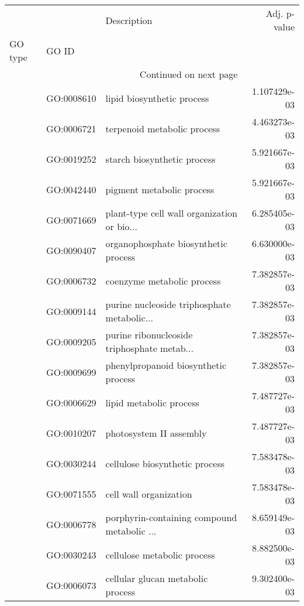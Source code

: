 \begin{longtable}{lllr}
\toprule
   &            &                                  Description &  Adj. p-value \\
GO type & GO ID &                                              &               \\
\midrule
\endhead
\midrule
\multicolumn{3}{r}{{Continued on next page}} \\
\midrule
\endfoot

\bottomrule
\endlastfoot
\multirow{71}{*}{BP} & GO:0008610 &                   lipid biosynthetic process &  1.107429e-03 \\
   & GO:0006721 &                  terpenoid metabolic process &  4.463273e-03 \\
   & GO:0019252 &                  starch biosynthetic process &  5.921667e-03 \\
   & GO:0042440 &                    pigment metabolic process &  5.921667e-03 \\
   & GO:0071669 &  plant-type cell wall organization or bio... &  6.285405e-03 \\
   & GO:0090407 &         organophosphate biosynthetic process &  6.630000e-03 \\
   & GO:0006732 &                   coenzyme metabolic process &  7.382857e-03 \\
   & GO:0009144 &  purine nucleoside triphosphate metabolic... &  7.382857e-03 \\
   & GO:0009205 &  purine ribonucleoside triphosphate metab... &  7.382857e-03 \\
   & GO:0009699 &         phenylpropanoid biosynthetic process &  7.382857e-03 \\
   & GO:0006629 &                      lipid metabolic process &  7.487727e-03 \\
   & GO:0010207 &                      photosystem II assembly &  7.487727e-03 \\
   & GO:0030244 &               cellulose biosynthetic process &  7.583478e-03 \\
   & GO:0071555 &                       cell wall organization &  7.583478e-03 \\
   & GO:0006778 &  porphyrin-containing compound metabolic ... &  8.659149e-03 \\
   & GO:0030243 &                  cellulose metabolic process &  8.882500e-03 \\
   & GO:0006073 &            cellular glucan metabolic process &  9.302400e-03 \\

\end{longtable}
